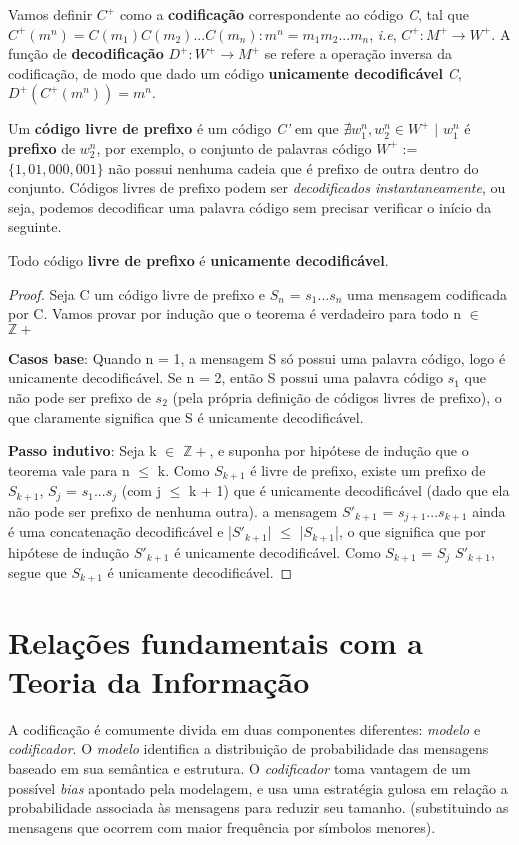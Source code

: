 Vamos definir \emph{$C^+$} como a \textbf{codificação} correspondente ao código \emph{C}, tal que $C^+(m^n) = C(m_1)C(m_2)...C(m_n) : m^n = m_1m_2...m_n$, \emph{i.e}, \emph{$C^+ : M^+ \rightarrow W^+$}. A função de \textbf{decodificação} \emph{$D^+ : W^+ \rightarrow M^+$} se refere a operação inversa da codificação, de modo que dado um código \textbf{unicamente decodificável} \emph{C}, $D^+(C^+(m^n)) = m^n$.

Um \textbf{código livre de prefixo} é um código \emph{C'} em que $\nexists w_1^n, w_2^n \in W^+$ $|$ $w_1^n$ é \textbf{prefixo} de $w_2^n$, por exemplo, o conjunto de palavras código \emph{$W^+$} := $\{1, 01, 000, 001\}$ não possui nenhuma cadeia que é prefixo de outra dentro do conjunto. Códigos livres de prefixo podem ser \emph{decodificados instantaneamente}, ou seja, podemos decodificar uma palavra código sem precisar verificar o início da seguinte.

\begin{theorem}
Todo código \textbf{livre de prefixo} é \textbf{unicamente decodificável}.

\begin{proof}
Seja C um código livre de prefixo e $S_n$ = $s_1...s_n$ uma mensagem codificada por C. Vamos provar por indução que o teorema é verdadeiro para todo n $\in$ $\mathbb{Z+}$

\item \textbf{Casos base}: Quando n = 1, a mensagem S só possui uma palavra código, logo é unicamente decodificável. Se n = 2, então S possui uma palavra código $s_1$ que não pode ser prefixo de $s_2$ (pela própria definição de códigos livres de prefixo), o que claramente significa que S é unicamente decodificável.

\item \textbf{Passo indutivo}: Seja k $\in$ $\mathbb{Z+}$, e suponha por hipótese de indução que o teorema vale para n $\leq$ k. Como $S_{k+1}$ é livre de prefixo, existe um prefixo de $S_{k+1}$, $S_j$ = $s_1...s_j$ (com j $\leq$ k + 1) que é unicamente decodificável (dado que ela não pode ser prefixo de nenhuma outra). a mensagem $S'_{k+1}$ = $s_{j+1}...s_{k+1}$ ainda é uma concatenação decodificável e |$S'_{k+1}$| $\leq$ |$S_{k+1}$|, o que significa que por hipótese de indução $S'_{k+1}$ é unicamente decodificável. Como $S_{k+1}$ = $S_j$ $S'_{k+1}$, segue que $S_{k+1}$ é unicamente decodificável.
\end{proof}
\end{theorem}

\section{Relações fundamentais com a Teoria da Informação}
A codificação é comumente divida em duas componentes diferentes: \emph{modelo} e \emph{codificador}. O \emph{modelo} identifica a distribuição de probabilidade das mensagens baseado em sua semântica e estrutura. O \emph{codificador} toma vantagem de um possível \emph{bias} apontado pela modelagem, e usa uma estratégia gulosa em relação a probabilidade associada às mensagens para reduzir seu tamanho. (substituindo as mensagens que ocorrem com maior frequência por símbolos menores).

